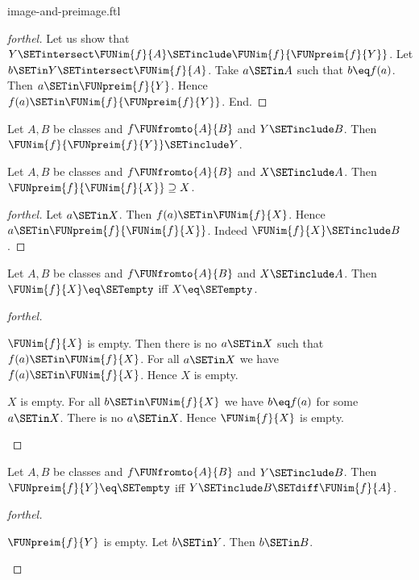 \documentclass{naproche-library}
\begin{document}
\begin{smodule}[title=Computation Laws for Images and Preimages]{image-and-preimage.ftl}
\begin{proof}[forthel]
  Let us show that $Y \SETintersect \FUNim{f}{A} \SETinclude \FUNim{f}{\FUNpreim{f}{Y}}$.
    Let $b \SETin Y \SETintersect \FUNim{f}{A}$.
    Take $a \SETin A$ such that $b \eq f(a)$.
    Then $a \SETin \FUNpreim{f}{Y}$.
    Hence $f(a) \SETin \FUNim{f}{\FUNpreim{f}{Y}}$.
  End.
\end{proof}

\begin{corollary}[forthel,id=FOUNDATIONS_07_5585105345052672]
  Let $A, B$ be classes and $f \FUNfromto{A}{B}$ and $Y \SETinclude B$.
  Then $\FUNim{f}{\FUNpreim{f}{Y}} \SETinclude Y$.
\end{corollary}

\begin{proposition}[forthel,id=FOUNDATIONS_07_4890896170483712]
  Let $A, B$ be classes and $f \FUNfromto{A}{B}$ and $X \SETinclude A$.
  Then $\FUNpreim{f}{\FUNim{f}{X}} \supseteq X$.
\end{proposition}
\begin{proof}[forthel]
  Let $a \SETin X$.
  Then $f(a) \SETin \FUNim{f}{X}$.
  Hence $a \SETin \FUNpreim{f}{\FUNim{f}{X}}$.
  Indeed $\FUNim{f}{X} \SETinclude B$.
\end{proof}

\begin{proposition}[forthel,id=FOUNDATIONS_07_3318372355801088]
  Let $A, B$ be classes and $f \FUNfromto{A}{B}$ and $X \SETinclude A$.
  Then $\FUNim{f}{X} \eq \SETempty$ iff $X \eq \SETempty$.
\end{proposition}
\begin{proof}[forthel]
  \begin{case}{$\FUNim{f}{X}$ is empty.}
    Then there is no $a \SETin X$ such that $f(a) \SETin \FUNim{f}{X}$.
    For all $a \SETin X$ we have $f(a) \SETin \FUNim{f}{X}$.
    Hence $X$ is empty.
  \end{case}

  \begin{case}{$X$ is empty.}
    For all $b \SETin \FUNim{f}{X}$ we have $b \eq f(a)$ for some $a \SETin X$.
    There is no $a \SETin X$.
    Hence $\FUNim{f}{X}$ is empty.
  \end{case}
\end{proof}

\begin{proposition}[forthel,id=FOUNDATIONS_07_8597874786959360]
  Let $A, B$ be classes and $f \FUNfromto{A}{B}$ and $Y \SETinclude B$.
  Then $\FUNpreim{f}{Y} \eq \SETempty$ iff $Y \SETinclude B \SETdiff \FUNim{f}{A}$.
\end{proposition}
\begin{proof}[forthel]
  \begin{case}{$\FUNpreim{f}{Y}$ is empty.}
    Let $b \SETin Y$.
    Then $b \SETin B$.


\end{case}
\end{proof}
\end{smodule}
\end{document}
